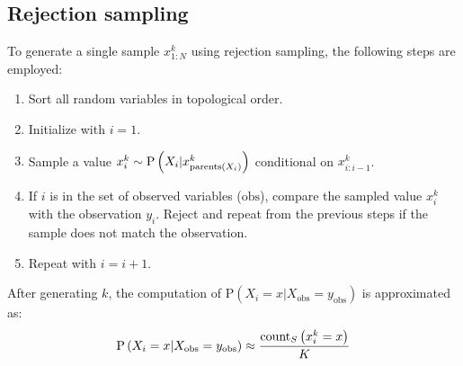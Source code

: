 \subsection{Rejection sampling}
To generate a single sample $x_{1:N}^k$ using rejection sampling, the following steps are employed:
\begin{enumerate}
    \item Sort all random variables in topological order. 
    \item Initialize with $i=1$.
    \item Sample a value $x_i^k \sim \text{P}\left(X_i|x_{\textnormal{parents}(X_i)}^k\right)$ conditional on $x_{i:i-1}^k$. 
    \item If $i$ is in the set of observed variables ($\text{obs}$), compare the sampled value $x_i^k$ with the observation $y_i$. 
        Reject and repeat from the previous steps if the sample does not match the observation.
    \item Repeat with $i=i+1$.
\end{enumerate}
After generating $k$, the computation of $\text{P}\left(X_i=x|X_{\text{obs}}=y_{\text{obs}}\right)$ is approximated as: 
\[\text{P}\left(X_i=x|X_{\text{obs}}=y_{\text{obs}}\right) \approx \dfrac{\textnormal{count}_S\left( x_i^k=x \right)}{K}\]
